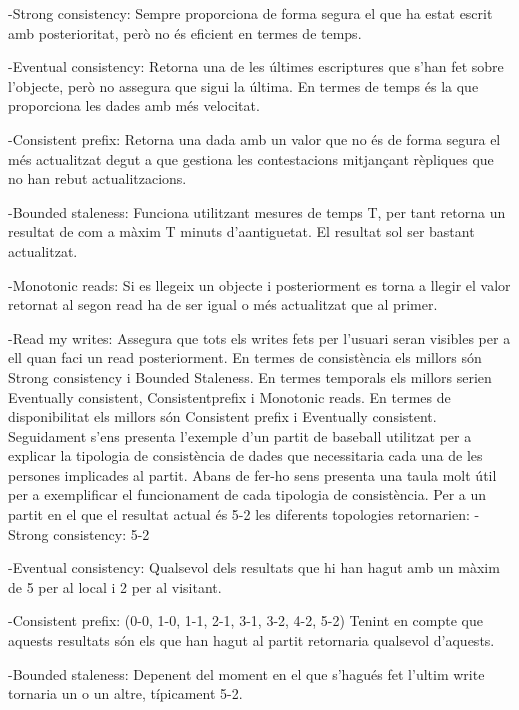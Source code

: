 \documentclass[a4paper, 10pt]{article}
\begin{document}
-Strong consistency: Sempre proporciona de forma segura el que ha estat escrit amb posterioritat, però no és eficient en termes de temps.


-Eventual consistency: Retorna una de les últimes escriptures que s'han fet sobre l'objecte, però no assegura que sigui la última. En termes de temps és la que proporciona les dades amb més velocitat.


-Consistent prefix: Retorna una dada amb un valor que no és de forma segura el més actualitzat degut a que gestiona les contestacions mitjançant rèpliques que no han rebut actualitzacions.


-Bounded staleness: Funciona utilitzant mesures de temps T, per tant retorna un resultat de com a màxim T minuts d'aantiguetat. El resultat sol ser bastant actualitzat.


-Monotonic reads: Si es llegeix un objecte i posteriorment es torna a llegir el valor retornat al segon read ha de ser igual o més actualitzat que al primer.


-Read my writes: Assegura que tots els writes fets per l'usuari seran visibles per a ell quan faci un read posteriorment.
\newline
\newline
En termes de consistència els millors són Strong consistency i Bounded Staleness. En termes temporals  els millors serien Eventually consistent, Consistentprefix i Monotonic reads. En termes de disponibilitat els millors són Consistent prefix i Eventually consistent.
Seguidament s'ens presenta l'exemple d'un partit de baseball utilitzat per a explicar la tipologia de consistència de dades que necessitaria cada una de les persones implicades al  partit.
Abans de fer-ho sens presenta una taula molt útil per a exemplificar el funcionament de cada tipologia de consistència.
Per a un partit en el que el resultat actual és 5-2 les diferents topologies retornarien:
\newline
\newline
-Strong consistency: 5-2


-Eventual consistency: Qualsevol dels resultats que hi han hagut amb un màxim de 5 per al local i 2 per al visitant.


-Consistent prefix: (0-0, 1-0, 1-1, 2-1, 3-1, 3-2, 4-2, 5-2) Tenint en compte que aquests resultats són els que han hagut al partit retornaria qualsevol d'aquests.


-Bounded staleness: Depenent del moment en el que s'hagués fet l'ultim write tornaria un o un altre, típicament 5-2.
\end{document}
